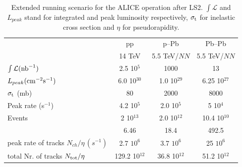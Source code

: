 \begin{table}[ht!]
\begin{minipage}{\textwidth}
\begin{center}
\begin{tabular}{l c c c}
\toprule
								& pp 					& p--Pb 	 			& Pb--Pb	\\
								& 14 TeV				& 5.5 TeV/$NN$		& 5.5 TeV/$NN$ \\
\midrule
$\int \mathcal{L} (\rm{nb}^{-1})$	 		& 2.5 10$^{5}$			& 1000				& 13		\\
$L_{peak} (\rm{cm}^{-2}\rm{s}^{-1})$		& 6.0 10$^{30}$		& 1.0 10$^{29}$		& 6.25 10$^{27}$	\\
$\sigma_{\rm t}$ (mb)				& 80					& 2000				& 8000 	\\
Peak rate (s$^{-1}$)					& 4.2 10$^5$			& 2.0 10$^5$			& 5 10$^4$	\\
Events							& 2 10$^{13}$			& 2.0 10$^{12}$		& 10.4 10$^{10}$	\\
\dndeta							& 6.46				& 18.4				& 492.5		\\
\midrule
peak rate of tracks $N_{ch}/\eta  \, (s^{-1})$   	& 2.7 $10^6$  		& 3.7 $10^6$ 			& 25 $10^6$ \\
total Nr. of tracks $N_{\rm{tot}}/\eta$			& 129.2 10$^{12}$	& 36.8 10$^{12}$		& 51.2 10$^{12}$	\\  
\midrule	
\end{tabular}
\end{center}
\caption{Extended running scenario for the ALICE operation after LS2. $\int{ \mathcal{L}}$ and $L_{peak}$ stand for integrated and peak luminosity respectively, $\sigma_{\rm t}$ for inelastic cross section and $\eta$ for pseudorapidity. }
\label{scenario}
\end{minipage}
\end{table}

